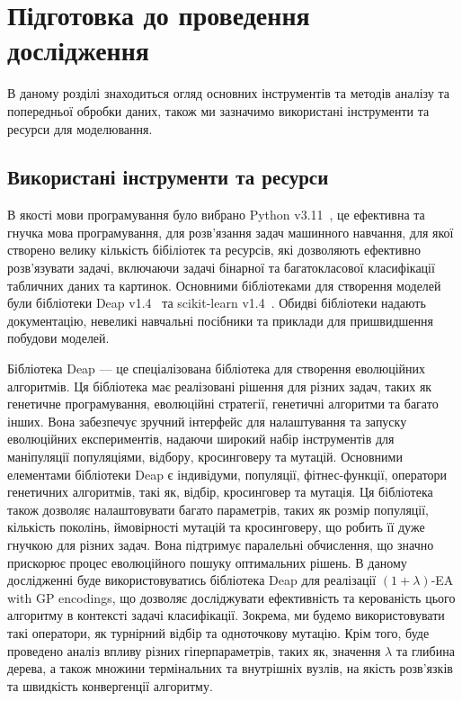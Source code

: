\chapter{Підготовка до проведення дослідження}
\label{chap:theory}

В даному розділі знаходиться огляд основних інструментів та методів аналізу та попередньої обробки даних, також ми зазначимо використані інструменти та ресурси для моделювання.

\section{Використані інструменти та ресурси}

В якості мови програмування було вибрано Python v3.11~\cite{ct18}, це ефективна та гнучка мова програмування, для розв'язання задач машинного навчання, для якої створено велику кількість бібіліотек та ресурсів, які дозволяють ефективно розв'язувати задачі, включаючи задачі бінарної та багатокласової класифікації табличних даних та картинок. Основними бібліотеками для створення моделей були бібліотеки Deap v1.4~\cite{ct19} та scikit-learn v1.4~\cite{20}. Обидві бібліотеки надають документацію, невеликі навчальні посібники та приклади для пришвидшення побудови моделей.

Бібліотека Deap --- це спеціалізована бібліотека для створення еволюційних алгоритмів. Ця бібліотека має реалізовані рішення для різних задач, таких як генетичне програмування, еволюційні стратегії, генетичні алгоритми та багато інших. Вона забезпечує зручний інтерфейс для налаштування та запуску еволюційних експериментів, надаючи широкий набір інструментів для маніпуляції популяціями, відбору, кросинговеру та мутацій. Основними елементами бібліотеки Deap є індивідуми, популяції, фітнес-функції, оператори генетичних алгоритмів, такі як, відбір, кросинговер та мутація. Ця бібліотека також дозволяє налаштовувати багато параметрів, таких як розмір популяції, кількість поколінь, ймовірності мутацій та кросинговеру, що робить її дуже гнучкою для різних задач. Вона підтримує паралельні обчислення, що значно прискорює процес еволюційного пошуку оптимальних рішень. В даному дослідженні буде використовуватись бібліотека Deap для реалізації $(1+\lambda)$-EA with GP encodings, що дозволяє досліджувати ефективність та керованість цього алгоритму в контексті задачі класифікації. Зокрема, ми будемо використовувати такі оператори, як турнірний відбір та одноточкову мутацію. Крім того, буде проведено аналіз впливу різних гіперпараметрів, таких як, значення $\lambda$ та глибина дерева, а також множини термінальних та внутрішніх вузлів, на якість розв'язків та швидкість конвергенції алгоритму.

